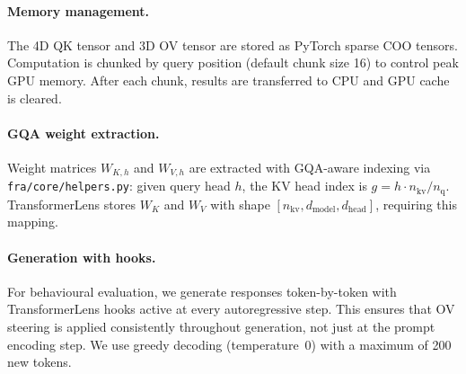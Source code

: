 \documentclass{article}
\theoremstyle{plain}
\theoremstyle{definition}
\theoremstyle{remark}
\newcommand{\WK}{W_K}
\newcommand{\WV}{W_V}
\newcommand{\dmodel}{d_{\mathrm{model}}}
\newcommand{\dhead}{d_{\mathrm{head}}}
\begin{document}
\paragraph{Memory management.} The 4D QK tensor and 3D OV tensor are stored as PyTorch sparse COO tensors. Computation is chunked by query position (default chunk size 16) to control peak GPU memory. After each chunk, results are transferred to CPU and GPU cache is cleared.

\paragraph{GQA weight extraction.} Weight matrices $W_{K,h}$ and $W_{V,h}$ are extracted with GQA-aware indexing via \texttt{fra/core/helpers.py}: given query head $h$, the KV head index is $g = h \cdot n_{\mathrm{kv}} / n_{\mathrm{q}}$. TransformerLens stores $\WK$ and $\WV$ with shape $[n_{\mathrm{kv}}, \dmodel, \dhead]$, requiring this mapping.

\paragraph{Generation with hooks.} For behavioural evaluation, we generate responses token-by-token with TransformerLens hooks active at every autoregressive step. This ensures that OV steering is applied consistently throughout generation, not just at the prompt encoding step. We use greedy decoding (temperature~0) with a maximum of 200 new tokens.
\end{document}
